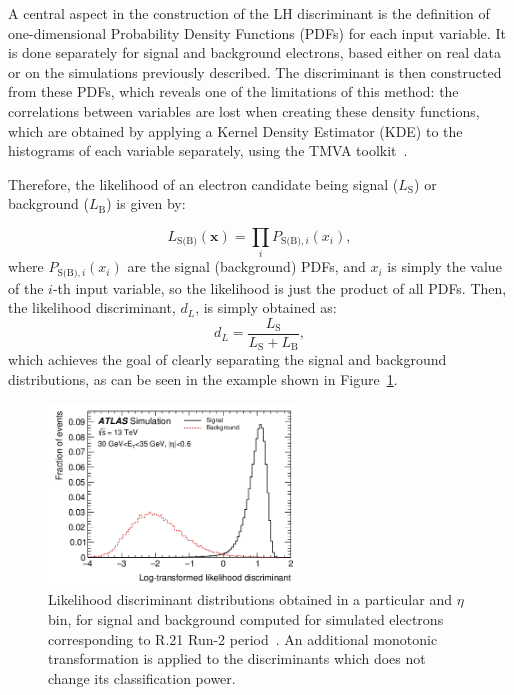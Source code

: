 A central aspect in the construction of the LH discriminant is the definition of one-dimensional Probability Density Functions (PDFs) for each input variable. It is done separately for signal and background electrons, based either on real data or on the simulations previously described.
The discriminant is then constructed from these PDFs, which reveals one of the limitations of this method: the correlations between variables are lost when creating these density functions, which are obtained by applying a Kernel Density Estimator (KDE) to the histograms of each variable separately, using the TMVA toolkit~\cite{tmvatoolkit}. 

Therefore, the likelihood of an electron candidate being signal ($L_{\text{S}}$) or background ($L_{\text{B}}$) is given by:

\begin{equation}
  L_{\text{S(B)}} (\textbf{x}) = \prod_{i} P_{\text{S(B)},i}(x_{i}),
\end{equation}
where $P_{\text{S(B)},i}(x_{i})$ are the signal (background) PDFs, and $x_{i}$ is simply the value of the $i$-th input variable, so the likelihood is just the product of all PDFs.
Then, the likelihood discriminant, $d_{L}$, is simply obtained as:
\begin{equation}
  d_{L} = \frac{L_{\text{S}}}{L_{\text{S}} + L_{\text{B}}},
\end{equation}
which achieves the goal of clearly separating the signal and background distributions, as can be seen in the example shown in Figure~\ref{fig:lhdis}.
\begin{figure}[htbp]
  \centering
  \includegraphics[width=0.6\textwidth]{images/lhdis.png}
  \caption{Likelihood discriminant distributions obtained in a particular \et and $\eta$ bin, for signal and background computed for simulated electrons corresponding to R.21 Run-2 period~\cite{Aaboud:2657964}. An additional monotonic transformation is applied to the discriminants which does not change its classification power.}
  \label{fig:lhdis}
\end{figure}

